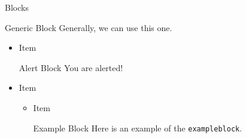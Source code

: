 \documentclass[12pt,t]{beamer}
\begin{document}
\begin{frame}[fragile]{Blocks}
  \begin{block}{Generic Block}
    Generally, we can use this one.
  \end{block}

  \begin{itemize}
    \item Item
      \begin{alertblock}{Alert Block}
        You are alerted!
      \end{alertblock}
    \item Item
      \begin{itemize}
        \item Item
          \begin{exampleblock}{Example Block}
            Here is an example of the \verb|exampleblock|.
          \end{exampleblock}
      \end{itemize}
  \end{itemize}
\end{frame}
\end{document}
